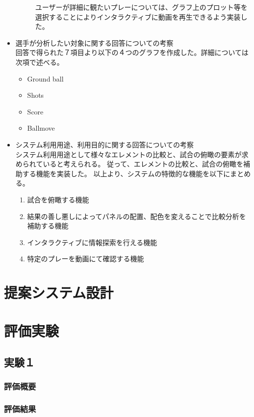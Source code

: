 \documentclass[sotsuron]{kuee}
\begin{document}
\begin{itemize}
\begin{description}
			ユーザーが詳細に観たいプレーについては、グラフ上のプロット等を選択することによりインタラクティブに動画を再生できるよう実装した。
		\end{description}
	\item 選手が分析したい対象に関する回答についての考察
		\\回答で得られた７項目より以下の４つのグラフを作成した。詳細については次項で述べる。
			\begin{itemize}
				\item Ground ball
				\item Shots
				\item Score
				\item Ballmove
			\end{itemize}
	\item システム利用用途、利用目的に関する回答についての考察
		\\システム利用用途として様々なエレメントの比較と、試合の俯瞰の要素が求められていると考えられる。
		従って、エレメントの比較と、試合の俯瞰を補助する機能を実装した。
		以上より、システムの特徴的な機能を以下にまとめる。
		\begin{enumerate}	
			\item 試合を俯瞰する機能
			\item 結果の善し悪しによってパネルの配置、配色を変えることで比較分析を補助する機能
			\item インタラクティブに情報探索を行える機能
			\item 特定のプレーを動画にて確認する機能
		\end{enumerate}
\end{itemize}

\chapter{提案システム設計}

\chapter{評価実験}
\section{実験１}
\subsection{評価概要}
\subsection{評価結果}
\end{document}

